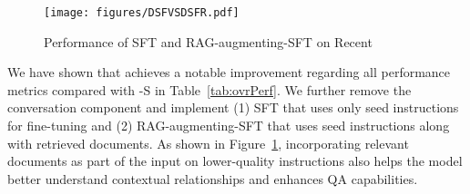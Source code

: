 \begin{figure}[htbp]
\centering
\texttt{[image: figures/DSFVSDSFR.pdf]}
    \caption{Performance of SFT and RAG-augmenting-SFT on Recent}
    \label{fig:ragVsnorag}
\end{figure}


We have shown that \ourmodel achieves a notable improvement regarding all performance metrics compared with \ourmodel-S in Table~\ref{tab:ovrPerf}. We further remove the conversation component and implement (1) SFT that uses only seed instructions for fine-tuning and (2) RAG-augmenting-SFT that uses seed instructions along with retrieved documents. As shown in Figure~\ref{fig:ragVsnorag}, incorporating relevant documents as part of the input on lower-quality instructions also helps the model better understand contextual relationships and enhances QA capabilities.












